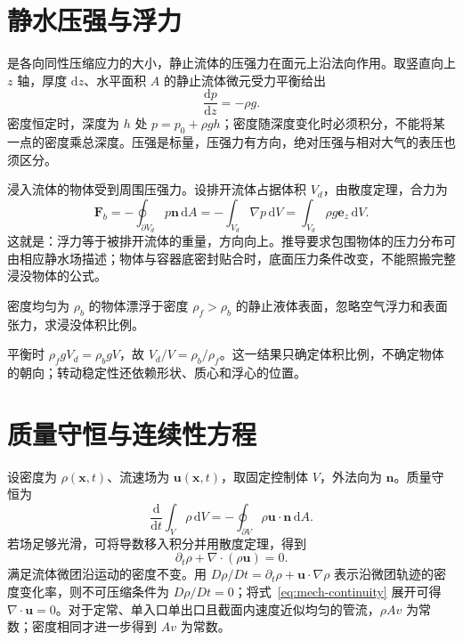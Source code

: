 \documentclass[UTF8,12pt,a4paper,fontset=fandol]{ctexbook}
\begin{document}
\section{静水压强与浮力}
是各向同性压缩应力的大小，静止流体的压强力在面元上沿法向作用。取竖直向上 $z$ 轴，厚度 $\mathrm dz$、水平面积 $A$ 的静止流体微元受力平衡给出
\begin{equation}
 \frac{\mathrm dp}{\mathrm dz}=-\rho g.
 \label{eq:mech-hydrostatic}
\end{equation}
密度恒定时，深度为 $h$ 处 $p=p_0+\rho gh$；密度随深度变化时必须积分，不能将某一点的密度乘总深度。压强是标量，压强力有方向，绝对压强与相对大气的表压也须区分。

浸入流体的物体受到周围压强力。设排开流体占据体积 $V_d$，由散度定理，合力为
\[
 \mathbf F_b=-\oint_{\partial V_d}p\mathbf n\,\mathrm dA
 =-\int_{V_d}\nabla p\,\mathrm dV
 =\int_{V_d}\rho g\mathbf e_z\,\mathrm dV.
\]
这就是：浮力等于被排开流体的重量，方向向上。推导要求包围物体的压力分布可由相应静水场描述；物体与容器底密封贴合时，底面压力条件改变，不能照搬完整浸没物体的公式。

\begin{example}[漂浮物的浸没比例]
密度均匀为 $\rho_b$ 的物体漂浮于密度 $\rho_f>\rho_b$ 的静止液体表面，忽略空气浮力和表面张力，求浸没体积比例。
\end{example}
\begin{solve}
平衡时 $\rho_f gV_d=\rho_bgV$，故 $V_d/V=\rho_b/\rho_f$。这一结果只确定体积比例，不确定物体的朝向；转动稳定性还依赖形状、质心和浮心的位置。
\end{solve}

\section{质量守恒与连续性方程}
设密度为 $\rho(\mathbf x,t)$、流速场为 $\mathbf u(\mathbf x,t)$，取固定控制体 $V$，外法向为 $\mathbf n$。质量守恒为
\[
 \frac{\mathrm d}{\mathrm dt}\int_V\rho\,\mathrm dV=-\oint_{\partial V}\rho\mathbf u\cdot\mathbf n\,\mathrm dA.
\]
若场足够光滑，可将导数移入积分并用散度定理，得到
\begin{equation}
 \partial_t\rho+\nabla\cdot(\rho\mathbf u)=0.
 \label{eq:mech-continuity}
\end{equation}
满足流体微团沿运动的密度不变。用 $D\rho/Dt=\partial_t\rho+\mathbf u\cdot\nabla\rho$ 表示沿微团轨迹的密度变化率，则不可压缩条件为 $D\rho/Dt=0$；将式~\eqref{eq:mech-continuity} 展开可得 $\nabla\cdot\mathbf u=0$。对于定常、单入口单出口且截面内速度近似均匀的管流，$\rho Av$ 为常数；密度相同才进一步得到 $Av$ 为常数。
\end{document}
